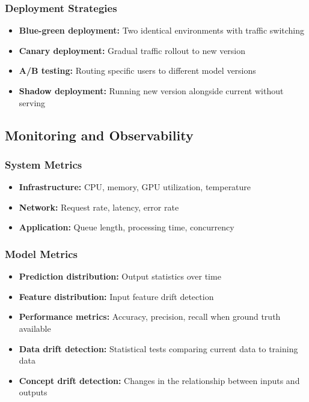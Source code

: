 \documentclass[11pt]{article}
\begin{document}
\subsubsection{Deployment Strategies}
\begin{itemize}
    \item \textbf{Blue-green deployment:} Two identical environments with traffic switching
    \item \textbf{Canary deployment:} Gradual traffic rollout to new version
    \item \textbf{A/B testing:} Routing specific users to different model versions
    \item \textbf{Shadow deployment:} Running new version alongside current without serving
\end{itemize}

\subsection{Monitoring and Observability}

\subsubsection{System Metrics}
\begin{itemize}
    \item \textbf{Infrastructure:} CPU, memory, GPU utilization, temperature
    \item \textbf{Network:} Request rate, latency, error rate
    \item \textbf{Application:} Queue length, processing time, concurrency
\end{itemize}

\subsubsection{Model Metrics}
\begin{itemize}
    \item \textbf{Prediction distribution:} Output statistics over time
    \item \textbf{Feature distribution:} Input feature drift detection
    \item \textbf{Performance metrics:} Accuracy, precision, recall when ground truth available
    \item \textbf{Data drift detection:} Statistical tests comparing current data to training data
    \item \textbf{Concept drift detection:} Changes in the relationship between inputs and outputs
\end{itemize}
\end{document}
